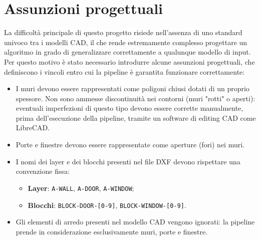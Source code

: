 \section{Assunzioni progettuali}
\label{sec:assunzioni_progettuali}

La difficoltà principale di questo progetto risiede nell'assenza di uno standard univoco tra i modelli CAD, il che rende estremamente complesso progettare un algoritmo in grado di generalizzare correttamente a qualunque modello di input. Per questo motivo è stato necessario introdurre alcune assunzioni progettuali, che definiscono i vincoli entro cui la pipeline è garantita funzionare correttamente:

\begin{itemize}
	\item I muri devono essere rappresentati come poligoni chiusi dotati di un proprio spessore. Non sono ammesse discontinuità nei contorni (muri "rotti" o aperti): eventuali imperfezioni di questo tipo devono essere corrette manualmente, prima dell'esecuzione della pipeline, tramite un software di editing CAD come LibreCAD.
	
	\item Porte e finestre devono essere rappresentate come aperture (fori) nei muri.
	
	\item I nomi dei layer e dei blocchi presenti nel file DXF devono rispettare una convenzione fissa:
	\begin{itemize}
		\item[--] \textbf{Layer}: \texttt{A-WALL}, \texttt{A-DOOR}, \texttt{A-WINDOW};
		\item[--] \textbf{Blocchi}: \texttt{BLOCK-DOOR-[0-9]}, \texttt{BLOCK-WINDOW-[0-9]}.
	\end{itemize}
	
	\item Gli elementi di arredo presenti nel modello CAD vengono ignorati: la pipeline prende in considerazione esclusivamente muri, porte e finestre.
\end{itemize}

